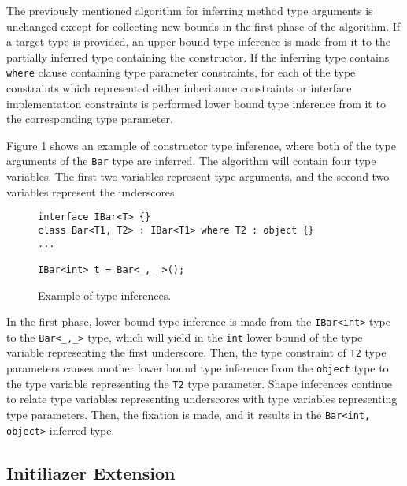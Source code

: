 The previously mentioned algorithm for inferring method type arguments is unchanged except for collecting new bounds in the first phase of the algorithm. 
If a target type is provided, an upper bound type inference is made from it to the partially inferred type containing the constructor. 
If the inferring type contains \texttt{where} clause containing type parameter constraints, for each of the type constraints which represented either inheritance constraints or interface implementation constraints is performed lower bound type inference from it to the corresponding type parameter.
\par
Figure \ref{img62:ctro} shows an example of constructor type inference, where both of the type arguments of the \texttt{Bar} type are inferred. 
The algorithm will contain four type variables. 
The first two variables represent type arguments, and the second two variables represent the underscores.
\begin{figure}[h!]
\begin{lstlisting}[style=csharp, mathescape=true]
interface IBar<T> {}
class Bar<T1, T2> : IBar<T1> where T2 : object {}
...

IBar<int> t = Bar<_, _>();
\end{lstlisting}
\caption{Example of type inferences.}
\label{img62:ctro}
\end{figure}
In the first phase, lower bound type inference is made from the \texttt{IBar<int>} type to the \texttt{Bar<\_,\_>} type, which will yield in the \texttt{int} lower bound of the type variable representing the first underscore. 
Then, the type constraint of \texttt{T2} type parameters causes another lower bound type inference from the \texttt{object} type to the type variable representing the \texttt{T2} type parameter. 
Shape inferences continue to relate type variables representing underscores with type variables representing type parameters. 
Then, the fixation is made, and it results in the \texttt{Bar<int, object>} inferred type.

\subsection{Initiliazer Extension} \label{sect12:ex1}

